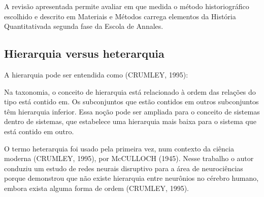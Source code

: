 \documentclass[
12pt,		%
openright,	%
twoside,  %
a4paper,			%
chapter=TITLE,		%
english,			%
french,				%
spanish,			%
brazil				%
]{USPSC-classe/USPSC}
\begin{document}
A revis\~ao apresentada permite avaliar em que medida o m\'etodo historiogr\'afico escolhido e descrito em Materiais e M\'etodos carrega elementos da \textquotedbl Hist\'oria Quantitativa\textquotedbl  da segunda fase da Escola de Annales.

















\subsection[Hierarquia versus heterarquia]{Hierarquia versus heterarquia}\label{Hierarquia versus heterarquia}
A hierarquia pode ser entendida como (CRUMLEY, 1995):


















\noindent\begin{center}\mbox{\centering{}}\end{center}


Na taxonomia, o conceito de hierarquia est\'a relacionado \`a ordem das rela\c{c}\~oes do tipo \textquotedbl est\'a contido em\textquotedbl . Os subconjuntos que est\~ao contidos em outros subconjuntos t\^em hierarquia inferior. Essa no\c{c}\~ao pode ser ampliada para o conceito de \textquotedbl sistemas dentro de sistemas\textquotedbl , que estabelece uma hierarquia mais baixa para o sistema que est\'a contido em outro.

















O termo heterarquia foi usado pela primeira vez, num contexto da ci\^encia moderna  (CRUMLEY, 1995), por  McCULLOCH (1945).  Nesse trabalho o autor conduziu um estudo de redes neurais disruptivo para a \'area de neuroci\^encias porque demonstrou que n\~ao existe hierarquia entre neur\^onios no c\'erebro humano, embora exista alguma forma de ordem  (CRUMLEY, 1995).
\end{document}
